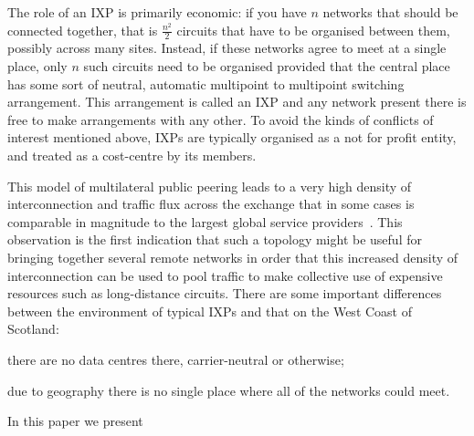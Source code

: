 The role of an \ac{IXP} is primarily economic: if
you have $n$ networks that should be connected together, that is
$\frac{n^2}{2}$ circuits that have to be organised between them,
possibly across many sites. Instead, if these networks agree to meet
at a single place, only $n$ such circuits need to be organised
provided that the central place has some sort of neutral, automatic
multipoint to multipoint switching arrangement. This arrangement is
called an \ac{IXP} and any network present there is free to make
arrangements with any other. To avoid the kinds of conflicts of
interest mentioned above, \acp{IXP} are typically organised as a not
for profit entity, and treated as a cost-centre by its members.

This model of multilateral public peering leads to a very high
density of interconnection and traffic flux across the exchange that
in some cases is comparable in magnitude to the largest global
service providers~\cite{Ager:2012:ALE:2342356.2342393}. This
observation is the first indication that such a topology might be
useful for bringing together several remote networks in order that
this increased density of interconnection can be used to pool traffic
to make collective use of expensive resources such as long-distance
circuits. There are some important differences between the environment
of typical \acp{IXP} and that on the West Coast of Scotland:
\begin{inparaenum}[(i)]
  \item there are no data centres there, carrier-neutral or otherwise;
  \item due to geography there is no single place where all of the
    networks could meet.
\end{inparaenum}

In this paper we present 

